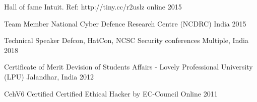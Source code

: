 



\begin{cvhonors}

  \cvhonor
    {Hall of fame} %
    {Intuit. Ref: http://tiny.cc/r2uslz} %
    {online} %
    {2015} %

  \cvhonor
    {Team Member} %
    {National Cyber Defence Research Centre (NCDRC)} %
    {India} %
    {2015} %

  \cvhonor
    {Technical Speaker} %
    {Defcon, HatCon, NCSC Security conferences} %
    {Multiple, India} %
    {2018} %

  \cvhonor
    {Certificate of Merit} %
    {Devision of Students Affairs - Lovely Professional University (LPU)} %
    {Jalandhar, India} %
    {2012} %
    
  \cvhonor
    {CehV6 Certified} %
    {Certified Ethical Hacker by EC-Council} %
    {Online} %
    {2011} %

\end{cvhonors}